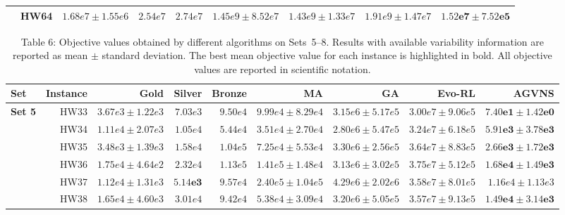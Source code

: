 \documentclass[11pt]{article}
\begin{document}
{\begin{table}
\begin{tabular}{l|r|r|r|r|r|r|r|r}
& HW64 & $1.68e7 \pm 1.55e6$ & $2.54e7$ & $2.74e7$
& $1.45e9 \pm 8.52e7$ & $1.43e9 \pm 1.33e7$
& $1.91e9 \pm 1.47e7$ & $\mathbf{1.52e7 \pm 7.52e5}$ \\
\hline
\end{tabular}
\end{table}

\begin{table}
\centering
\caption*{Table 6: Objective values obtained by different algorithms on Sets~5--8. Results with available variability information are reported as mean $\pm$ standard deviation. The best mean objective value for each instance is highlighted in bold. All objective values are reported in scientific notation.}
\label{tab:results_set5_8}

\setlength{\tabcolsep}{2.5pt}
\scriptsize

\begin{tabular}{l|r|r|r|r|r|r|r|r}
\hline
\textbf{Set}
& \textbf{Instance}
& \textbf{Gold}
& \textbf{Silver}
& \textbf{Bronze}
& \textbf{MA}
& \textbf{GA}
& \textbf{Evo-RL}
& \textbf{AGVNS} \\
\hline

\multirow{8}{*}{\textbf{Set 5}}
& HW33 & $3.67e3 \pm 1.22e3$ & $7.03e3$ & $9.50e4$
& $9.99e4 \pm 8.29e4$
& $3.15e6 \pm 5.17e5$
& $3.00e7 \pm 9.06e5$
& $\mathbf{7.40e1 \pm 1.42e0}$ \\

& HW34 & $1.11e4 \pm 2.07e3$ & $1.05e4$ & $5.44e4$
& $3.51e4 \pm 2.70e4$
& $2.80e6 \pm 5.47e5$
& $3.24e7 \pm 6.18e5$
& $\mathbf{5.91e3 \pm 3.78e3}$ \\

& HW35 & $3.48e3 \pm 1.39e3$ & $1.58e4$ & $1.04e5$
& $7.25e4 \pm 5.53e4$
& $3.30e6 \pm 2.56e5$
& $3.64e7 \pm 8.83e5$
& $\mathbf{2.66e3 \pm 1.72e3}$ \\

& HW36 & $1.75e4 \pm 4.64e2$ & $2.32e4$ & $1.13e5$
& $1.41e5 \pm 1.48e4$
& $3.13e6 \pm 3.02e5$
& $3.75e7 \pm 5.12e5$
& $\mathbf{1.68e4 \pm 1.49e3}$ \\

& HW37 & $1.12e4 \pm 1.31e3$ & $\mathbf{5.14e3}$ & $9.57e4$
& $2.40e5 \pm 1.04e5$
& $4.29e6 \pm 2.02e6$
& $3.58e7 \pm 8.01e5$
& $1.16e4 \pm 1.13e3$ \\

& HW38 & $1.65e4 \pm 4.60e3$ & $3.01e4$ & $9.42e4$
& $5.38e4 \pm 3.09e4$
& $3.20e6 \pm 5.05e5$
& $3.57e7 \pm 9.13e5$
& $\mathbf{1.49e4 \pm 3.14e3}$ \\


\end{tabular}
\end{table}}
\end{document}
